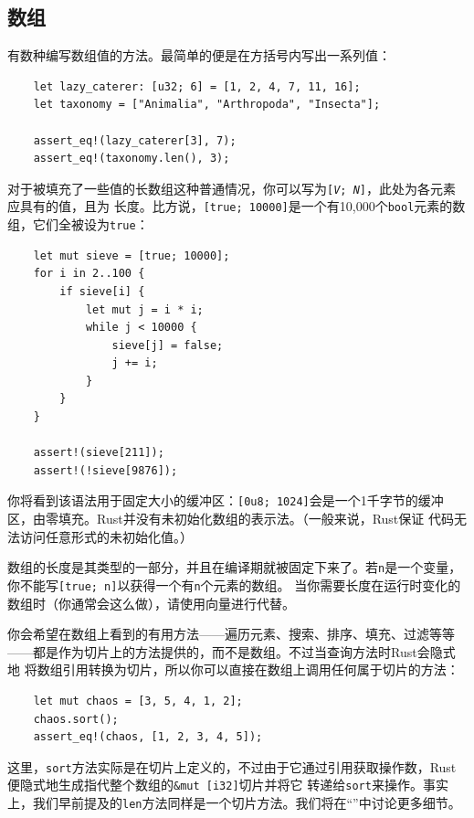 \medskip
\subsection{数组}
有数种编写数组值的方法。最简单的便是在方括号内写出一系列值：
\begin{verbatim}
    let lazy_caterer: [u32; 6] = [1, 2, 4, 7, 11, 16];
    let taxonomy = ["Animalia", "Arthropoda", "Insecta"];

    assert_eq!(lazy_caterer[3], 7);
    assert_eq!(taxonomy.len(), 3);
\end{verbatim}
 
\smallskip
对于被填充了一些值的长数组这种普通情况，你可以写为\texttt{[\textit{V}; \textit{N}]}，此处为各元素应具有的值，且为
长度。比方说，\texttt{[true; 10000]}是一个有10,000个\texttt{bool}元素的数组，它们全被设为\texttt{true}：
\begin{verbatim}
    let mut sieve = [true; 10000];
    for i in 2..100 {
        if sieve[i] {
            let mut j = i * i;
            while j < 10000 {
                sieve[j] = false;
                j += i;
            }
        }
    }

    assert!(sieve[211]);
    assert!(!sieve[9876]);
\end{verbatim}
 
\smallskip
你将看到该语法用于固定大小的缓冲区：\texttt{[0u8; 1024]}会是一个1千字节的缓冲区，由零填充。Rust并没有未初始化数组的表示法。（一般来说，Rust保证
代码无法访问任意形式的未初始化值。）

\medskip
数组的长度是其类型的一部分，并且在编译期就被固定下来了。若\texttt{n}是一个变量，你不能写\texttt{[true; n]}以获得一个有\texttt{n}个元素的数组。
当你需要长度在运行时变化的数组时（你通常会这么做），请使用向量进行代替。

\medskip
你会希望在数组上看到的有用方法------遍历元素、搜索、排序、填充、过滤等等------都是作为切片上的方法提供的，而不是数组。不过当查询方法时Rust会隐式地
将数组引用转换为切片，所以你可以直接在数组上调用任何属于切片的方法：
\begin{verbatim}
    let mut chaos = [3, 5, 4, 1, 2];
    chaos.sort();
    assert_eq!(chaos, [1, 2, 3, 4, 5]);
\end{verbatim}
 
\smallskip
这里，\texttt{sort}方法实际是在切片上定义的，不过由于它通过引用获取操作数，Rust便隐式地生成指代整个数组的\texttt{\&mut [i32]}切片并将它
转递给\texttt{sort}来操作。事实上，我们早前提及的\texttt{len}方法同样是一个切片方法。我们将在“”中讨论更多细节。

